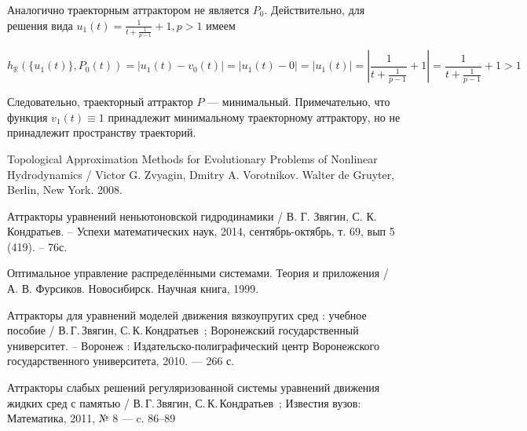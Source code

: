 Аналогично траекторным аттрактором не является $P_0$.
Действительно, для решения вида $u_1(t)=\frac{1}{t+\frac{1}{p-1}}+1, p > 1$ имеем

\begin{equation}
	h_{\mathbb{R}}(\{u_1(t)\},P_0(t)) =
	|u_1(t) - v_0(t)| =
	|u_1(t) - 0| =
	|u_1(t)| =
	\left| \frac{1}{t+\frac{1}{p-1}}+1 \right| =
	\frac{1}{t+\frac{1}{p-1}}+1 >	1
\end{equation}

Следовательно, траекторный аттрактор $P$ --- минимальный.
Примечательно, что функция $v_1(t) \equiv 1$ принадлежит минимальному траекторному аттрактору,
но не принадлежит пространству траекторий.




\begin{thebibliography}{99}

 Topological Approximation Methods for Evolutionary Problems of Nonlinear Hydrodynamics / Victor G. Zvyagin, Dmitry A. Vorotnikov. Walter de Gruyter, Berlin, New York. 2008.

 Аттракторы уравнений неньютоновской гидродинамики / В. Г. Звягин, С. К. Кондратьев. – Успехи математических наук, 2014, сентябрь-октябрь, т. 69, вып 5 (419). – 76с.

 Оптимальное управление распределёнными системами. Теория и приложения / А. В. Фурсиков. Новосибирск. Научная книга, 1999.

 Аттракторы для уравнений моделей движения вязкоупругих сред : учебное пособие / В.\,Г.\,Звягин, С.\,К.\,Кондратьев~; Воронежский государственный университет. -- Воронеж : Издательско-полиграфический центр Воронежского государственного университета, 2010. --- 266 с.

 Аттракторы слабых решений регуляризованной системы уравнений движения жидких сред с памятью / В.\,Г.\,Звягин, С.\,К.\,Кондратьев~; Известия вузов: Математика, 2011, № 8 --- c. 86–89

\end{thebibliography}


